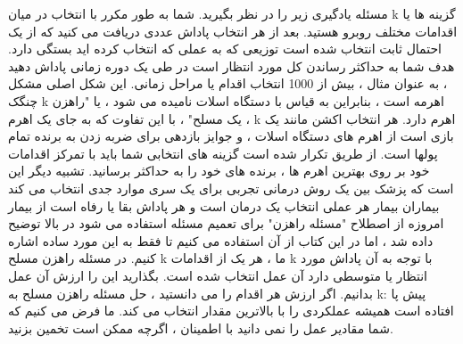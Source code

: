مسئله یادگیری زیر را در نظر بگیرید. شما به طور مکرر با انتخاب در میان k گزینه ها یا اقدامات مختلف روبرو هستید. بعد از هر انتخاب پاداش عددی دریافت می کنید که از یک احتمال ثابت انتخاب شده است
توزیعی که به عملی که انتخاب کرده اید بستگی دارد. هدف شما به حداکثر رساندن کل مورد انتظار است
در طی یک دوره زمانی پاداش دهید ، به عنوان مثال ، بیش از 1000 انتخاب اقدام یا مراحل زمانی.
این شکل اصلی مشکل چنگک k اهرمه است ، بنابراین به قیاس با دستگاه اسلات نامیده می شود ، یا
"راهزن یک مسلح" ، با این تفاوت که به جای یک اهرم ، k اهرم دارد. هر انتخاب اکشن مانند یک بازی است
از اهرم های دستگاه اسلات ، و جوایز بازدهی برای ضربه زدن به برنده تمام پولها است. از طریق تکرار شده است
گزینه های انتخابی شما باید با تمرکز اقدامات خود بر روی بهترین اهرم ها ، برنده های خود را به حداکثر برسانید.
تشبیه دیگر این است که پزشک بین یک روش درمانی تجربی برای یک سری موارد جدی انتخاب می کند
بیماران بیمار هر عملی انتخاب یک درمان است و هر پاداش بقا یا رفاه است
از بیمار امروزه از اصطلاح "مسئله راهزن" برای تعمیم مسئله استفاده می شود
در بالا توضیح داده شد ، اما در این کتاب از آن استفاده می کنیم تا فقط به این مورد ساده اشاره کنیم.
در مسئله راهزن مسلح k ما ، هر یک از اقدامات k با توجه به آن پاداش مورد انتظار یا متوسطی دارد
آن عمل انتخاب شده است. بگذارید این را ارزش آن عمل بدانیم.
اگر ارزش هر اقدام را می دانستید ، حل مسئله راهزن مسلح به k: پیش پا افتاده است
همیشه عملکردی را با بالاترین مقدار انتخاب می کند. ما فرض می کنیم که شما مقادیر عمل را نمی دانید
با اطمینان ، اگرچه ممکن است تخمین بزنید.

